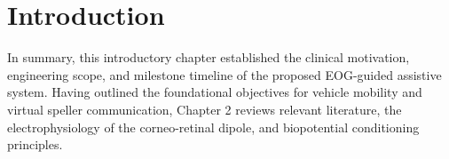 \chapter{Introduction}
\label{ch:introduction}









\vspace{1em}
In summary, this introductory chapter established the clinical motivation, engineering scope, and milestone timeline of the proposed EOG-guided assistive system. Having outlined the foundational objectives for vehicle mobility and virtual speller communication, Chapter 2 reviews relevant literature, the electrophysiology of the corneo-retinal dipole, and biopotential conditioning principles.
